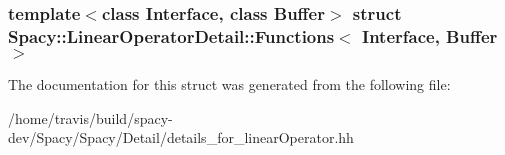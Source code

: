 \subsubsection*{template$<$class \-Interface, class \-Buffer$>$ struct Spacy\-::\-Linear\-Operator\-Detail\-::\-Functions$<$ Interface, Buffer $>$}



\-The documentation for this struct was generated from the following file\-:\begin{DoxyCompactItemize}
\item 
/home/travis/build/spacy-\/dev/\-Spacy/\-Spacy/\-Detail/details\-\_\-for\-\_\-linear\-Operator.\-hh\end{DoxyCompactItemize}
